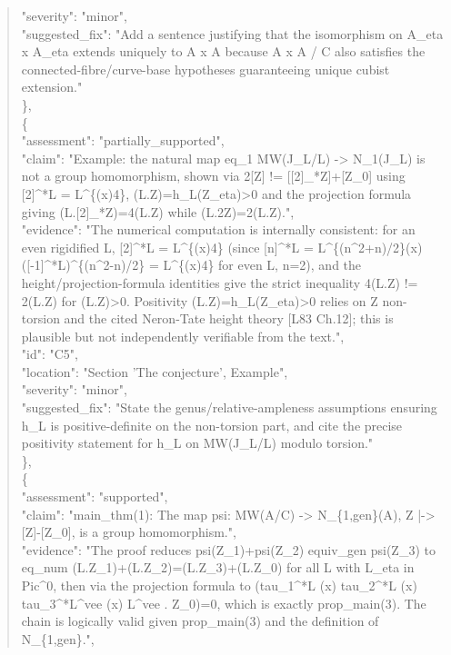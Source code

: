 \documentclass[11pt]{article}
\begin{document}
\begin{quote}
      "severity": "minor",\\
      "suggested\_fix": "Add a sentence justifying that the isomorphism on A\_eta x A\_eta extends uniquely to A x A because A x A / C also satisfies the connected-fibre/curve-base hypotheses guaranteeing unique cubist extension."\\
    \},\\
    \{\\
      "assessment": "partially\_supported",\\
      "claim": "Example: the natural map eq\_1 MW(J\_L/L) -> N\_1(J\_L) is not a group homomorphism, shown via 2[Z] != [[2]\_*Z]+[Z\_0] using [2]\^{}*L = L\^{}\{(x)4\}, (L.Z)=h\_L(Z\_eta)>0 and the projection formula giving (L.[2]\_*Z)=4(L.Z) while (L.2Z)=2(L.Z).",\\
      "evidence": "The numerical computation is internally consistent: for an even rigidified L, [2]\^{}*L = L\^{}\{(x)4\} (since [n]\^{}*L = L\^{}\{(n\^{}2+n)/2\}(x)([-1]\^{}*L)\^{}\{(n\^{}2-n)/2\} = L\^{}\{(x)4\} for even L, n=2), and the height/projection-formula identities give the strict inequality 4(L.Z) != 2(L.Z) for (L.Z)>0. Positivity (L.Z)=h\_L(Z\_eta)>0 relies on Z non-torsion and the cited Neron-Tate height theory [L83 Ch.12]; this is plausible but not independently verifiable from the text.",\\
      "id": "C5",\\
      "location": "Section 'The conjecture', Example",\\
      "severity": "minor",\\
      "suggested\_fix": "State the genus/relative-ampleness assumptions ensuring h\_L is positive-definite on the non-torsion part, and cite the precise positivity statement for h\_L on MW(J\_L/L) modulo torsion."\\
    \},\\
    \{\\
      "assessment": "supported",\\
      "claim": "main\_thm(1): The map psi: MW(A/C) -> N\_\{1,gen\}(A), Z |-> [Z]-[Z\_0], is a group homomorphism.",\\
      "evidence": "The proof reduces psi(Z\_1)+psi(Z\_2) equiv\_gen psi(Z\_3) to eq\_num (L.Z\_1)+(L.Z\_2)=(L.Z\_3)+(L.Z\_0) for all L with L\_eta in Pic\^{}0, then via the projection formula to (tau\_1\^{}*L (x) tau\_2\^{}*L (x) tau\_3\^{}*L\^{}vee (x) L\^{}vee . Z\_0)=0, which is exactly prop\_main(3). The chain is logically valid given prop\_main(3) and the definition of N\_\{1,gen\}.",\\

\end{quote}
\end{document}
